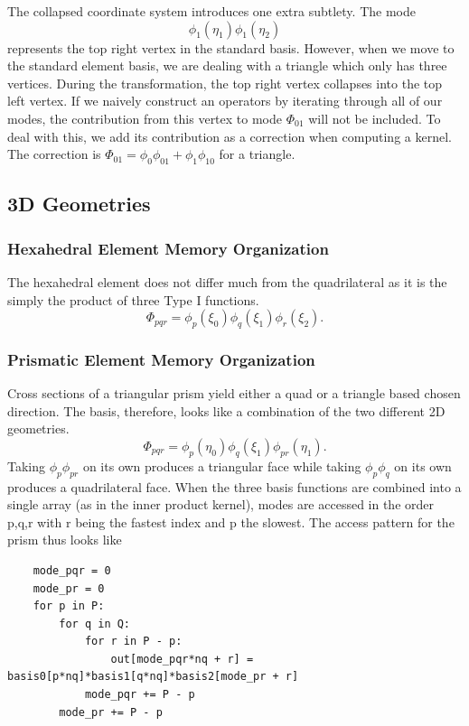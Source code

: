 The collapsed coordinate system introduces one extra subtlety. The mode
\[
    \phi_1(\eta_1) \phi_1(\eta_2)
\]
represents the top right vertex in the standard basis. However, when we move to the standard element basis, we are dealing with a triangle which only has three vertices. During the transformation, the top right vertex collapses into the top left vertex. If we naively construct an operators by iterating through all of our modes, the contribution from this vertex to mode $\Phi_{01}$ will not be included. To deal with this, we add its contribution as a correction when computing a kernel. The correction is $\Phi_{01} = \phi_0 \phi_{01} + \phi_1 \phi_{10}$ for a triangle.

\subsection{3D Geometries}

\subsubsection{Hexahedral Element Memory Organization}
The hexahedral element does not differ much from the quadrilateral as it is the simply the product of three Type I functions.
\[
    \Phi_{pqr} = \phi_p(\xi_0) \phi_q(\xi_1) \phi_r(\xi_2).
\]

\subsubsection{Prismatic Element Memory Organization}
Cross sections of a triangular prism yield either a quad or a triangle based chosen direction. The basis, therefore, looks like a combination of the two different 2D geometries.
\[
    \Phi_{pqr} = \phi_p(\eta_0)\phi_q(\xi_1)\phi_{pr}(\eta_1).
\]
Taking $\phi_p \phi_{pr}$ on its own produces a triangular face while taking $\phi_p \phi_q$ on its own produces a quadrilateral face. When the three basis functions are combined into a single array (as in the inner product kernel), modes are accessed in the order p,q,r with r being the fastest index and p the slowest. The access pattern for the prism thus looks like
\begin{lstlisting}
    mode_pqr = 0
    mode_pr = 0
    for p in P:
        for q in Q:
            for r in P - p:
                out[mode_pqr*nq + r] = basis0[p*nq]*basis1[q*nq]*basis2[mode_pr + r]
            mode_pqr += P - p
        mode_pr += P - p
\end{lstlisting}

